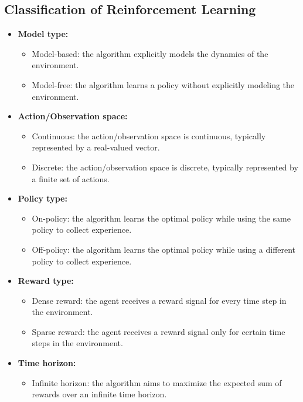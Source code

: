 \subsection{Classification of Reinforcement Learning}
\begin{minipage}{\textwidth}
\begin{itemize}

    \item \textbf{Model type:}
    \begin{itemize}
    \item Model-based: the algorithm explicitly models the dynamics of the environment.
    \item Model-free: the algorithm learns a policy without explicitly modeling the environment.
    \end{itemize}
    \item \textbf{Action/Observation space:}
    \begin{itemize}
    \item Continuous: the action/observation space is continuous, typically represented by a real-valued vector.
    \item Discrete: the action/observation space is discrete, typically represented by a finite set of actions.
    \end{itemize}
    \item \textbf{Policy type:}
    \begin{itemize}
    \item On-policy: the algorithm learns the optimal policy while using the same policy to collect experience.
    \item Off-policy: the algorithm learns the optimal policy while using a different policy to collect experience.
    \end{itemize}
    \item \textbf{Reward type:}
    \begin{itemize}
    \item Dense reward: the agent receives a reward signal for every time step in the environment.
    \item Sparse reward: the agent receives a reward signal only for certain time steps in the environment.
    \end{itemize}
    \item \textbf{Time horizon:}
    \begin{itemize}
    \item Infinite horizon: the algorithm aims to maximize the expected sum of rewards over an infinite time horizon.

\end{itemize}
\end{itemize}
\end{minipage}
